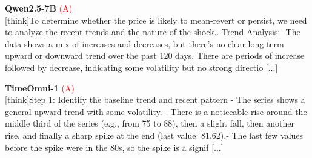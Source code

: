 \noindent
\begin{minipage}[t]{0.28\textwidth}
\colorbox{red!8}{\parbox{\dimexpr\textwidth-2\fboxsep}{
\textbf{Qwen2.5-7B} \textcolor{red}{(A)} \\[2pt]
\tiny
[think]\newline To determine whether the price is likely to mean-revert or persist, we need to analyze the recent trends and the nature of the shock.. Trend Analysis:\newline    - The data shows a mix of increases and decreases, but there's no clear long-term upward or downward trend over the past 120 days. There are periods of increase followed by decrease, indicating some volatility but no strong directio [...]
}}
\end{minipage}
\hfill
\begin{minipage}[t]{0.28\textwidth}
\colorbox{red!8}{\parbox{\dimexpr\textwidth-2\fboxsep}{
\textbf{TimeOmni-1} \textcolor{red}{(A)} \\[2pt]
\tiny
[think]\newline Step 1: Identify the baseline trend and recent pattern  \newline - The series shows a general upward trend with some volatility.  \newline - There is a noticeable rise around the middle third of the series (e.g., from  75 to  88), then a slight fall, then another rise, and finally a sharp spike at the end (last value: 81.62).\newline - The last few values before the spike were in the 80s, so the spike is a signif [...]
}}
\end{minipage}
\hfill
